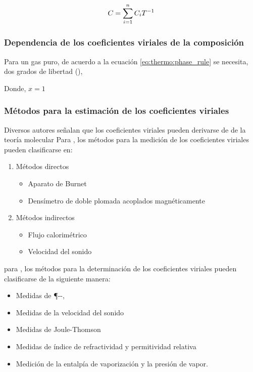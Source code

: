     \begin{equation}
      C_{} = \sum_{i=1}^{n} C_{i} T^{-1}{}
    \end{equation}

\subsubsection*{Dependencia de los coeficientes viriales de la composición}
    Para un gas puro, de acuerdo a la ecuación \eqref{eq:thermo:phase_rule} se necesita, dos grados de libertad (\freeDegree),  

    Donde, $x = 1$ 

\subsubsection{Métodos para la estimación de los coeficientes viriales}
    Diversos autores señalan que los coeficientes viriales pueden derivarse de \parencite[p. 4.13]{Poling2001} de la teoría molecular
    Para \parencite{Trusler10.1039/9781782627043-00152}, los métodos para la medición de los coeficientes viriales pueden clasificarse en:

    \begin{enumerate}[label=(\alph*)]
      \item Métodos directos
        \begin{itemize}
          \item Aparato de Burnet
          \item Densímetro de doble plomada acoplados magnéticamente
        \end{itemize}
      \item  Métodos indirectos
        \begin{itemize}
          \item Flujo calorimétrico
          \item Velocidad del sonido
        \end{itemize}
    \end{enumerate}

    para \parencite{Dymond2002}, los métodos para la determinación de los coeficientes viriales pueden clasificarse de la siguiente manera:

    \begin{itemize}
      \item Medidas de {\P{}-\Vm-\T{}},
      \item Medidas de la velocidad del sonido
      \item Medidas de Joule-Thomson
      \item Medidas de índice de refractividad y permitividad relativa
      \item Medición de la entalpía de vaporización y la presión de vapor. 
    \end{itemize}

